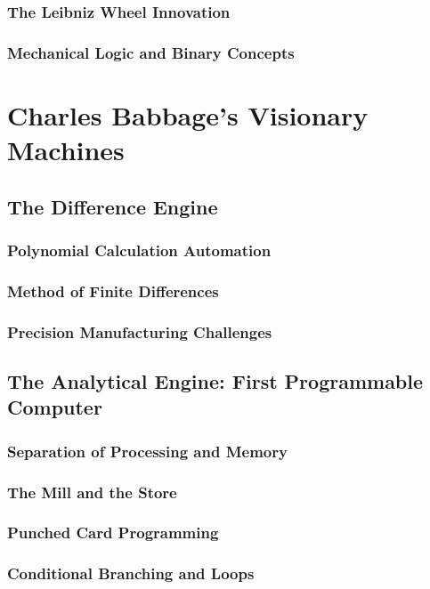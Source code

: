 \documentclass[12pt, oneside]{book}
\begin{document}
\subsubsection{The Leibniz Wheel Innovation}
\subsubsection{Mechanical Logic and Binary Concepts}

\section{Charles Babbage's Visionary Machines}
\subsection{The Difference Engine}
\subsubsection{Polynomial Calculation Automation}
\subsubsection{Method of Finite Differences}
\subsubsection{Precision Manufacturing Challenges}

\subsection{The Analytical Engine: First Programmable Computer}
\subsubsection{Separation of Processing and Memory}
\subsubsection{The Mill and the Store}
\subsubsection{Punched Card Programming}
\subsubsection{Conditional Branching and Loops}
\end{document}

